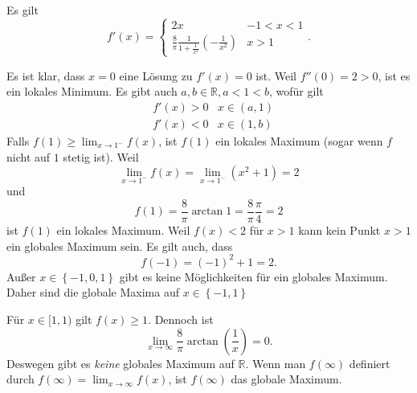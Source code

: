 \documentclass[prb,12pt]{revtex4-2}
\theoremstyle{definition}
\theoremstyle{definition}
\newcommand{\R}{\mathbb{R}}
\begin{document}
Es gilt
\[
f'(x)=\begin{cases}
	2x & -1< x < 1 \\
	\frac{8}{\pi}\frac{1}{1+\frac{1}{x^2}}\left( -\frac{1}{x^2} \right) & x>1
\end{cases}
.\] 

Es ist klar, dass $x=0$ eine L\"{o}sung zu $f'(x)=0$ ist. Weil $f''(0)=2>0$, ist es ein lokales Minimum. Es gibt auch $a,b\in \R, a<1<b$, wof\"{u}r gilt
\begin{align*}
	& f'(x)>0 & x\in (a,1)\\
	& f'(x)<0 & x\in (1,b)
\end{align*}
Falls $f(1)\ge \lim_{x \to 1^{-}} f(x)$, ist $f(1)$ ein lokales Maximum (sogar wenn $f$ nicht auf $1$ stetig ist). Weil
\[
	\lim_{x \to 1^{-}} f(x)=\lim_{x \to 1^{-}} \left( x^2+1 \right) =2\] 
	und
	\[
	f(1)=\frac{8}{\pi}\arctan 1=\frac{8}{\pi}\frac{\pi}{4}=2\] 
	ist $f(1)$ ein lokales Maximum. Weil $f(x)<2$ f\"{u}r $x>1$ kann kein Punkt $x>1$ ein globales Maximum sein. Es gilt auch, dass
	\[
	f(-1)=(-1)^2+1=2
	.\] 
	Außer $x\in \left\{ -1,0,1 \right\} $ gibt es keine M\"{o}glichkeiten f\"{u}r ein globales Maximum. Daher sind die globale Maxima auf $x\in \left\{ -1,1 \right\} $ 

	F\"{u}r $x\in [1,1)$ gilt $f(x)\ge 1$. Dennoch ist
	\[
	\lim_{x \to \infty} \frac{8}{\pi}\arctan\left( \frac{1}{x} \right) =0
	.\] 
	Deswegen gibt es \emph{keine} globales Maximum auf $\R$. Wenn man $f(\infty)$ definiert durch $f(\infty)=\lim_{x \to \infty} f(x)$, ist $f(\infty)$ das globale Maximum.
\end{document}
